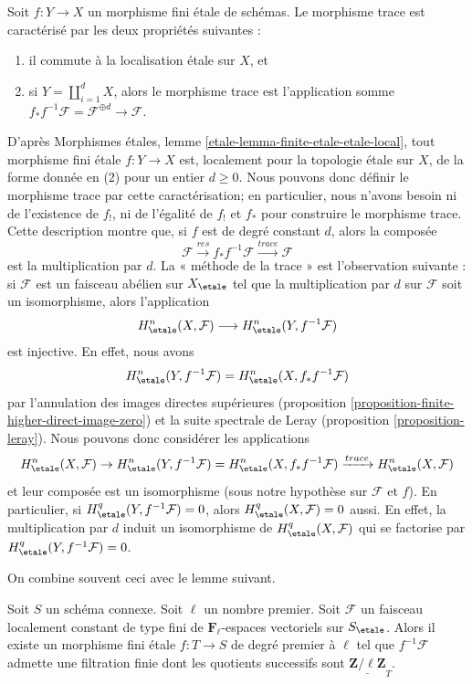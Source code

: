\noindent
Soit $f : Y \to X$ un morphisme fini \'etale de sch\'emas. Le morphisme trace est
caract\'eris\'e par les deux propri\'et\'es suivantes :
\begin{enumerate}
\item il commute \`a la localisation \'etale sur $X$, et
\item si $Y = \coprod_{i = 1}^d X$, alors le morphisme trace est
l'application somme $f_*f^{-1} \mathcal{F} = \mathcal{F}^{\oplus d} \to \mathcal{F}$.
\end{enumerate}
D'apr\`es Morphismes étales, lemme \ref{etale-lemma-finite-etale-etale-local},
tout morphisme fini \'etale $f : Y \to X$ est, localement pour la topologie \'etale sur $X$,
de la forme donn\'ee en (2) pour un entier $d \geq 0$. Nous pouvons donc
d\'efinir le morphisme trace par cette caract\'erisation; en particulier,
nous n'avons besoin ni de l'existence de $f_!$, ni de l'\'egalit\'e
de $f_!$ et $f_*$ pour construire le morphisme trace.
Cette description montre que, si $f$ est de degr\'e constant $d$, alors
la compos\'ee
$$
\mathcal{F} \xrightarrow{res}
f_* f^{-1} \mathcal{F} \xrightarrow{trace}
\mathcal{F}
$$
est la multiplication par $d$. La « m\'ethode de la trace »
est l'observation suivante : si $\mathcal{F}$
est un faisceau ab\'elien sur $X_\etale$ tel que la multiplication par $d$
sur $\mathcal{F}$ soit un isomorphisme, alors l'application
$$
H^n_\etale(X, \mathcal{F}) \longrightarrow H^n_\etale(Y, f^{-1}\mathcal{F})
$$
est injective. En effet, nous avons
$$
H^n_\etale(Y, f^{-1}\mathcal{F}) = H^n_\etale(X, f_*f^{-1}\mathcal{F})
$$
par l'annulation des images directes sup\'erieures
(proposition \ref{proposition-finite-higher-direct-image-zero})
et la suite spectrale de Leray
(proposition \ref{proposition-leray}).
Nous pouvons donc consid\'erer les applications
$$
H^n_\etale(X, \mathcal{F}) \to
H^n_\etale(Y, f^{-1}\mathcal{F})= H^n_\etale(X, f_*f^{-1}\mathcal{F})
\xrightarrow{trace}
H^n_\etale(X, \mathcal{F})
$$
et leur compos\'ee est un isomorphisme (sous notre hypoth\`ese sur $\mathcal{F}$
et $f$). En particulier, si
$H_\etale^q(Y, f^{-1}\mathcal{F}) = 0$, alors
$H_\etale^q(X, \mathcal{F}) = 0$ aussi.
En effet, la multiplication par $d$ induit un
isomorphisme de $H_\etale^q(X, \mathcal{F})$ qui se factorise par
$H_\etale^q(Y, f^{-1}\mathcal{F})= 0$.

\medskip\noindent
On combine souvent ceci avec le lemme suivant.

\begin{lemma}
\label{lemma-pullback-filtered}
Soit $S$ un sch\'ema connexe. Soit $\ell$ un nombre premier. Soit
$\mathcal{F}$ un faisceau localement constant de type fini de
$\mathbf{F}_\ell$-espaces vectoriels sur $S_\etale$.
Alors il existe un morphisme fini \'etale
$f : T \to S$ de degr\'e premier \`a $\ell$ tel que $f^{-1}\mathcal{F}$
admette une filtration finie dont les quotients successifs sont
$\underline{\mathbf{Z}/\ell\mathbf{Z}}_T$.
\end{lemma}


